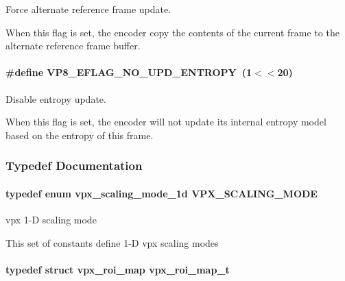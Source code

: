 Force alternate reference frame update. 

When this flag is set, the encoder copy the contents of the current frame to the alternate reference frame buffer. \hypertarget{group__vp8__encoder_ga5b91ad179910d4efc23aef66c7b2148b}{
\paragraph[{V\-P8\-\_\-\-E\-F\-L\-A\-G\-\_\-\-N\-O\-\_\-\-U\-P\-D\-\_\-\-E\-N\-T\-R\-O\-P\-Y}]{\setlength{\rightskip}{0pt plus 5cm}\#define V\-P8\-\_\-\-E\-F\-L\-A\-G\-\_\-\-N\-O\-\_\-\-U\-P\-D\-\_\-\-E\-N\-T\-R\-O\-P\-Y~(1$<$$<$20)}}\label{group__vp8__encoder_ga5b91ad179910d4efc23aef66c7b2148b}


Disable entropy update. 

When this flag is set, the encoder will not update its internal entropy model based on the entropy of this frame. 

\subsubsection{Typedef Documentation}
\hypertarget{group__vp8__encoder_ga100ca891ad96995e61780ae777bf8663}{
\paragraph[{V\-P\-X\-\_\-\-S\-C\-A\-L\-I\-N\-G\-\_\-\-M\-O\-D\-E}]{\setlength{\rightskip}{0pt plus 5cm}typedef enum {\bf vpx\-\_\-scaling\-\_\-mode\-\_\-1d}  {\bf V\-P\-X\-\_\-\-S\-C\-A\-L\-I\-N\-G\-\_\-\-M\-O\-D\-E}}}\label{group__vp8__encoder_ga100ca891ad96995e61780ae777bf8663}


vpx 1-\/\-D scaling mode 

This set of constants define 1-\/\-D vpx scaling modes \hypertarget{group__vp8__encoder_ga5be1a94d436a5e9296f5be06f57ccbd1}{
\paragraph[{vpx\-\_\-roi\-\_\-map\-\_\-t}]{\setlength{\rightskip}{0pt plus 5cm}typedef struct {\bf vpx\-\_\-roi\-\_\-map}  {\bf vpx\-\_\-roi\-\_\-map\-\_\-t}}}\label{group__vp8__encoder_ga5be1a94d436a5e9296f5be06f57ccbd1}


